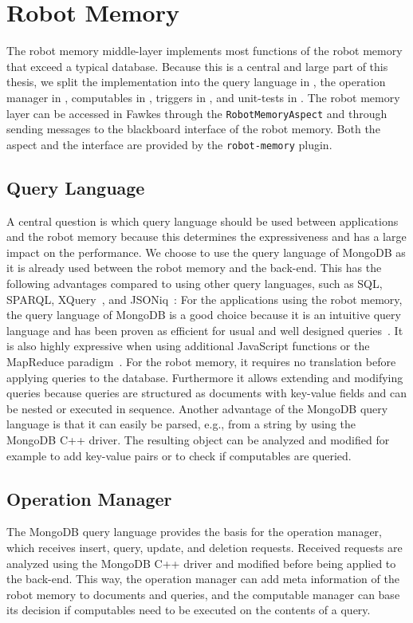 \section{Robot Memory}
\label{sec:impl-memory}
The robot memory middle-layer implements most functions of the robot
memory that exceed a typical database. Because this is a central and
large part of this thesis, we split the implementation into the query
language in , the operation manager in
, computables in
, triggers in ,
and unit-tests in . The robot memory layer
can be accessed in Fawkes through the \texttt{RobotMemoryAspect} and
through sending messages to the blackboard interface of the robot
memory. Both the aspect and the interface are provided by the
\texttt{robot-memory} plugin.

\subsection{Query Language}
\label{sec:impl-query-language}
A central question is which query language should be used between
applications and the robot memory because this determines the
expressiveness and has a large impact on the performance. We choose to
use the query language of MongoDB as it is already used between the
robot memory and the back-end. This has the following advantages compared to
using other query languages, such as SQL, SPARQL,
XQuery~\cite{query-languages}, and JSONiq~\cite{jsoniq}:  For the
applications using the robot memory, the query language of MongoDB is
a good choice because it is an intuitive query language and has been
proven as efficient for usual and well designed queries~\cite{RoboDB}. It is also
highly expressive when using additional JavaScript functions or the
MapReduce paradigm~\cite{mongodb}.
 For the robot memory, it
requires no translation before applying queries to the
database. Furthermore it allows extending and modifying queries
because queries are structured as documents with key-value fields and
can be nested or executed in sequence. Another advantage of the
MongoDB query language is that it can easily be parsed, e.g., from a
string by using the MongoDB C++ driver. The resulting object can be
analyzed and modified for example to add key-value pairs or to check
if computables are queried.

\subsection{Operation Manager}
\label{sec:impl-opmanager}
The MongoDB query language provides the basis for the operation
manager, which receives insert, query, update, and deletion
requests. Received requests are analyzed using the MongoDB C++ driver
and modified before being applied to the back-end. This way, the
operation manager can add meta information of the robot memory to
documents and queries, and the computable manager can base its
decision if computables need to be executed on the contents of a
query.

